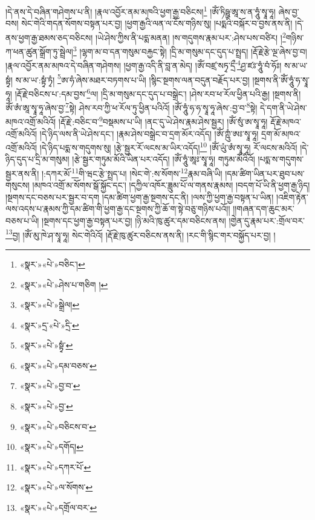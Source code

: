 །དེ་ནས་དེ་བཞིན་གཤེགས་པ་ནི། །རྣལ་འབྱོར་ནམ་མཁའི་ཕྱག་རྒྱ་བཅིངས།\footnote{«སྣར་»«པེ་»བཅིང་།} །ཨོཾ་ཏིཥྛ་ཨཱ་ས་ན་ཧཱུཾ་སྭཱ་ཧཱ། ཞེས་བྱ་བས། སེང་གེའི་གདན་སོགས་བསྟན་པར་བྱ། །ཕྱག་རྒྱའི་ལན་ལ་ངོས་གཉིས་སུ། །པདྨའི་བསྐོར་བ་བྱས་ནས་ནི། །དེ་ནས་ཕྱག་རྒྱ་ཐམས་ཅད་བཅིངས། །ཡེ་ཤེས་ཀྱིས་ནི་པདྨ་མནན། །ས་གདུགས་རྣམ་པར་:ཤེས་པས་བཙིར། །\footnote{«སྣར་»«པེ་»ཤེས་པ་གཅིག །}གཉིས་ཀ་ཕན་ཚུན་སྒྲོག་ཏུ་སྦྲེལ།\footnote{«སྣར་»«པེ་»སྒྲེལ།} །ལྷག་མ་བ་དན་གསུམ་བརྐྱང་སྟེ། །དྲི་མ་གསུམ་དང་དུད་པ་སྤྲད། །རྡོ་རྗེ་རྩེ་ལྔ་ཞེས་བྱ་བ། །རྣལ་འབྱོར་ནམ་མཁའ་དེ་བཞིན་གཤེགས། །ཕྱག་རྒྱ་འདི་ནི་བླ་ན་མེད། །ཨོཾ་བཛྲ་སཏྭ་དྲྀ་\footnote{«སྣར་»དྲ་«པེ་»དྲི་}ཤྱ་ཛཿ་ཧཱུཾ་བཾ་ཧོཿ། ས་མ་ཡ་སྟྭཾ། ས་མ་ཡ་:སྟྭཾ་ཏྭཾ། \footnote{«སྣར་»«པེ་»སྟྭཾ་}ཨ་ཧཾ་ཞེས་མཐར་བཏགས་པ་ཡི། །སྙིང་སྔགས་ལན་བདུན་བརྗོད་པར་བྱ། །སྔགས་ནི་ཨོཾ་ཧཱུཾ་ཧ་སྭཱ་ཧཱ། །རྡོ་རྗེ་བཅིངས་པ་:དམ་བྱས་\footnote{«སྣར་»«པེ་»དམ་བཅས་}ལ། །དྲི་མ་གསུམ་དང་དུད་པ་བསྒྲེང་། །ཤེས་རབ་ཕ་རོལ་ཕྱིན་པའི་རྒྱ། །སྔགས་ནི། ཨོཾ་ཨཾ་ཨཱ་སྭཱ་ཧཱ་ཞེས་བྱ་\footnote{«སྣར་»«པེ་»བྱ་བ་}སྟེ། ཤེས་རབ་ཀྱི་ཕ་རོལ་ཏུ་ཕྱིན་པའིའོ། །ཨོཾ་ཧཱུཾ་ཧ་ཧ་སྭཱ་ཧཱ་ཞེས་:བྱ་བ་\footnote{«སྣར་»«པེ་»བྱ་}སྟེ། དེ་དག་ནི་ཡེ་ཤེས་མཁའ་འགྲོ་མའིའོ། །རྡོ་རྗེ་:བཅིང་བ་\footnote{«སྣར་»«པེ་»བཅིངས་བ་}བསྡམས་པ་ཡི། །ནང་དུ་ཡེ་ཤེས་རྣམ་ཤེས་སྦྱར། །ཨོཾ་སུཾ་ཨ་སྭཱ་ཧཱ། རྡོ་རྗེ་མཁའ་འགྲོ་མའིའོ། །དེ་ཉིད་ལས་ནི་ཡེ་ཤེས་དང་། །རྣམ་ཤེས་བསྒྲེང་བ་དྲག་མོར་འདོད། །ཨོཾ་ཀྵུཾ་ཨཿ་སྭཱ་ཧཱ། དྲག་མོ་མཁའ་འགྲོ་མའིའོ། །དེ་ཉིད་པདྨ་ས་གདུགས་སུ། །རྩེ་སྦྱར་རོ་ལངས་མ་ཡིར་འདོད།\footnote{«སྣར་»«པེ་»དགོད།} །ཨོཾ་ཡུཾ་ཨཾ་སྭཱ་ཧཱ། རོ་ལངས་མའིའོ། །དེ་ཉིད་དུད་པ་དྲི་མ་གསུམ། །རྩེ་སྦྱར་གཏུམ་མོའི་ཡིན་པར་འདོད། །ཨོཾ་ཧཱུཾ་ཨཱཿ་སྭཱ་ཧཱ། གཏུམ་མོའིའོ། །པདྨ་ས་གདུགས་སྦྱར་ནས་ནི། །:དཀར་མོ་\footnote{«སྣར་»«པེ་»དཀར་པོ་}གི་ཝང་རྩེ་སྤྲད་པ། །སེང་གེ་:ས་སོགས་\footnote{«སྣར་»«པེ་»ལ་སོགས་}རྣམ་བཞི་ཡི། །དམ་ཚིག་ཡིན་པར་ཐུབ་པས་གསུངས། །མཁའ་འགྲོ་མ་སོགས་སྒོ་སྐྱོང་དང་། །དཀྱིལ་འཁོར་ཟླུམ་པོ་ལ་གནས་རྣམས། །བདག་པོ་ཡི་ནི་ཕྱག་རྒྱ་ཉིད། །སྔགས་དང་བཅས་པར་སྦྱར་བ་དག །དམ་ཚིག་ཕྱག་རྒྱ་སྔགས་དང་ནི། །ལས་ཀྱི་ཕྱག་རྒྱ་བསྟན་པ་ཡིན། །འཇིག་རྟེན་ལས་འདས་པ་རྣམས་ཀྱི་དམ་ཚིག་གི་ཕྱག་རྒྱ་དང་སྔགས་ཀྱི་ཆོ་ག་སྟེ་བཅུ་གཉིས་པའོ།། །།གཞན་དག་ཆུང་མར་བཅས་པ་ཡི། །སྔགས་དང་ཕྱག་རྒྱ་བསྟན་པར་བྱ། །ཉི་མའི་ཁུ་ཚུར་དམ་བཅིངས་ནས། །གྱེན་དུ་རྣམ་པར་:གྲོལ་བར་\footnote{«སྣར་»«པེ་»དགྲོལ་བར་}བྱ། །ཨོཾ་མུ་ཁེ་ཤ་སྭཱ་ཧཱ། སེང་གེའིའོ། །རྡོ་རྗེ་ཁུ་ཚུར་བཅིངས་ནས་ནི། །རང་གི་སྙིང་གར་བསྐྱོད་པར་བྱ། །
